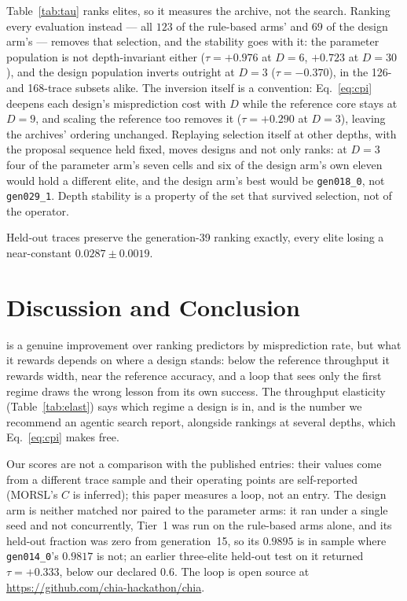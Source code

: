 \documentclass[conference]{IEEEtran}
\newcommand{\vfs}{\text{VFS}}
\begin{document}
Table~\ref{tab:tau} ranks elites, so it measures the archive, not the search.
Ranking every evaluation instead --- all $123$ of the rule-based arms' and $69$
of the design arm's --- removes that selection, and the stability goes with it:
the parameter population is not depth-invariant either ($\tau=+0.976$ at $D=6$,
$+0.723$ at $D=30$), and the design population inverts outright at $D=3$
($\tau=-0.370$), in the 126- and 168-trace subsets alike. The inversion itself
is a convention: Eq.~\eqref{eq:cpi} deepens each design's misprediction cost
with $D$ while the reference core stays at $D=9$, and scaling the reference too
removes it ($\tau=+0.290$ at $D=3$), leaving the archives' ordering unchanged. Replaying selection itself at other depths, with the
proposal sequence held fixed, moves designs and not only ranks: at $D=3$ four of
the parameter arm's seven cells and six of the design arm's own eleven would
hold a different elite, and the design arm's best would be \texttt{gen018\_0},
not \texttt{gen029\_1}. Depth stability is a property of the set that survived
selection, not of the operator.

Held-out traces preserve the generation-39 ranking exactly, every elite losing
a near-constant $0.0287\pm0.0019$.

\section{Discussion and Conclusion}

\vfs{} is a genuine improvement over ranking predictors by misprediction rate,
but what it rewards depends on where a design stands: below the reference
throughput it rewards width, near the reference accuracy, and a loop that
sees only the first regime draws the wrong lesson from its own success. The
throughput elasticity (Table~\ref{tab:elast}) says which regime a design is in,
and is the number we recommend an agentic search report, alongside rankings at
several depths, which Eq.~\eqref{eq:cpi} makes free.

Our scores are not a comparison with the published entries: their values come
from a different trace sample and their operating points are self-reported
(MORSL's $C$ is inferred); this paper measures a loop, not an entry. The design
arm is neither matched nor paired to the parameter arms: it ran under a single
seed and not concurrently, Tier~1 was run on the rule-based arms alone, and its
held-out fraction was zero from generation~15, so
its $0.9895$ is in sample where \texttt{gen014\_0}'s $0.9817$ is not; an earlier
three-elite held-out test on it returned $\tau=+0.333$, below our declared
$0.6$. The loop is open source at \url{https://github.com/chia-hackathon/chia}.
\end{document}
